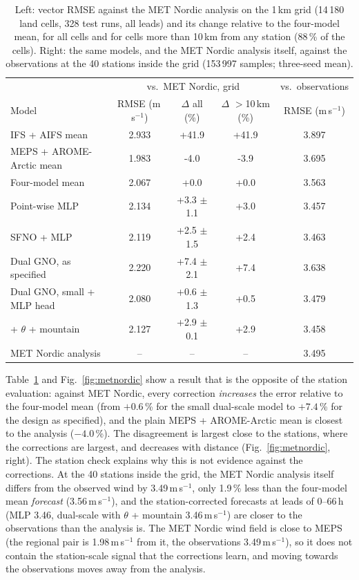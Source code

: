 \documentclass[10pt,a4paper]{article}
\begin{document}
\begin{table}[t]
\centering\small
\caption{Left: vector RMSE against the MET Nordic analysis on the 1\,km grid (14\,180 land cells,
328 test runs, all leads) and its change relative to the four-model mean, for all cells and for
cells more than 10\,km from any station (88\,\% of the cells). Right: the same models, and the
MET Nordic analysis itself, against the observations at the 40 stations inside the grid
(153\,997 samples; three-seed mean).}\label{tab:metnordic}
\begin{tabular}{@{}lccc|c@{}}
\toprule
& \multicolumn{3}{c|}{vs.\ MET Nordic, grid} & vs.\ observations\\
Model & RMSE (m\,s$^{-1}$) & $\Delta$ all (\%) & $\Delta$ $>$10\,km (\%) & RMSE (m\,s$^{-1}$)\\
\midrule
IFS + AIFS mean & 2.933 & +41.9 & +41.9 & 3.897 \\
MEPS + AROME-Arctic mean & 1.983 & -4.0 & -3.9 & 3.695 \\
Four-model mean & 2.067 & +0.0 & +0.0 & 3.563 \\
\midrule
Point-wise MLP & 2.134 & +3.3 $\pm$ 1.1 & +3.0 & 3.457 \\
SFNO + MLP & 2.119 & +2.5 $\pm$ 1.5 & +2.4 & 3.463 \\
Dual GNO, as specified & 2.220 & +7.4 $\pm$ 2.1 & +7.4 & 3.638 \\
Dual GNO, small + MLP head & 2.080 & +0.6 $\pm$ 1.3 & +0.5 & 3.479 \\
\quad + $\theta$ + mountain & 2.127 & +2.9 $\pm$ 0.1 & +2.9 & 3.458 \\
\midrule
MET Nordic analysis & -- & -- & -- & 3.495 \\
\bottomrule
\end{tabular}
\end{table}

Table~\ref{tab:metnordic} and Fig.~\ref{fig:metnordic} show a result that is the opposite of the
station evaluation: against MET Nordic, every correction \emph{increases} the error relative to the
four-model mean (from $+0.6$\,\% for the small dual-scale model to $+7.4$\,\% for the design as
specified), and the plain MEPS + AROME-Arctic mean is closest to the analysis ($-4.0$\,\%). The
disagreement is largest close to the stations, where the corrections are largest, and decreases
with distance (Fig.~\ref{fig:metnordic}, right). The station check explains why this is not
evidence against the corrections. At the 40 stations inside the grid, the MET Nordic analysis
itself differs from the observed wind by 3.49\,m\,s$^{-1}$, only 1.9\,\% less than the
four-model mean \emph{forecast} (3.56\,m\,s$^{-1}$), and the station-corrected forecasts at leads
of 0--66\,h (MLP 3.46, dual-scale with $\theta$ + mountain 3.46\,m\,s$^{-1}$) are closer to the
observations than the analysis is. The MET Nordic wind field is close to MEPS (the regional
pair is 1.98\,m\,s$^{-1}$ from it, the observations 3.49\,m\,s$^{-1}$), so it does not contain
the station-scale signal that the corrections learn, and moving towards the observations moves
away from the analysis.
\end{document}
